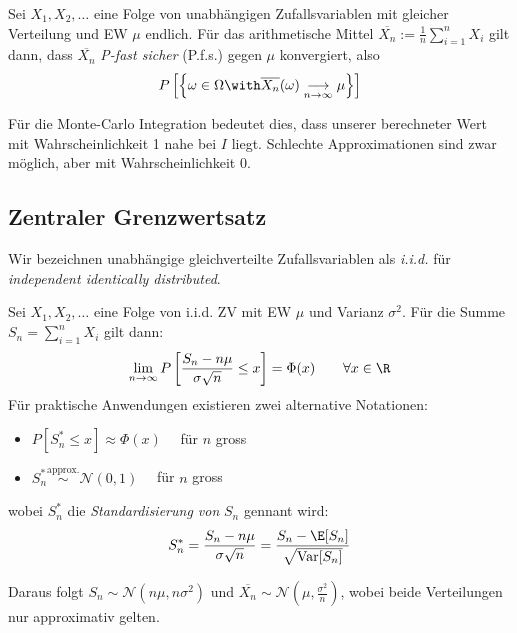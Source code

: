 \begin{satz}
Sei $X_1,X_2,\dots$ eine Folge von unabhängigen Zufallsvariablen mit gleicher Verteilung und EW $\mu$ endlich. Für das arithmetische Mittel $\overline{X_n} := \frac{1}{n} \sum_{i=1}^n X_i$ gilt dann, dass $\overline{X_n}$ \textit{P-fast sicher} (P.f.s.) gegen $\mu$ konvergiert, also
$$ P \left[ \left \{ \omega \in \Omega \with \overline{X_n}(\omega) \underset{n\to\infty}{\longrightarrow} \mu \right \} \right] $$
\end{satz}
Für die Monte-Carlo Integration bedeutet dies, dass unserer berechneter Wert mit Wahrscheinlichkeit 1 nahe bei $I$ liegt. Schlechte Approximationen sind zwar möglich, aber mit Wahrscheinlichkeit 0.

\subsection{Zentraler Grenzwertsatz}
Wir bezeichnen unabhängige gleichverteilte Zufallsvariablen als \textit{i.i.d.} für \textit{independent identically distributed}.
\begin{satz}
Sei $X_1,X_2,\dots$ eine Folge von i.i.d. ZV mit EW $\mu$ und Varianz $\sigma^2$. Für die Summe $S_n = \sum_{i=1}^n X_i$ gilt dann:
$$ \lim_{n\to\infty} P\left[\frac{S_n - n\mu}{\sigma \sqrt{n}} \leq x \right] = \Phi(x) \quad \quad \forall x\in\R$$
Für praktische Anwendungen existieren zwei alternative Notationen:
\begin{itemize}
\item $P[S_n^* \leq x ] \approx \Phi(x) \quad$ für $n$ gross
\item $S_n^* \overset{\mbox{approx.}}{\sim} \mathcal{N}(0,1) \quad$ für $n$ gross
\end{itemize}
wobei $S_n^*$ die \textit{Standardisierung von} $S_n$ gennant wird:
$$ S_n^* = \frac{S_n - n\mu}{\sigma\sqrt{n}}= \frac{S_n - \E[S_n]}{\sqrt{\mathrm{Var}[S_n]}}$$
\end{satz}
Daraus folgt $S_n \sim \mathcal{N}(n\mu,n\sigma^2)$ und $\overline{X_n} \sim \mathcal{N}(\mu, \frac{\sigma^2}{n} )$, wobei beide Verteilungen nur approximativ gelten.\\

